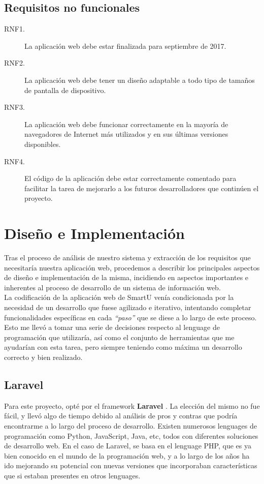 \subsection*{Requisitos no funcionales}
\begin{description}
    \item[RNF1.] La aplicación web debe estar finalizada para septiembre de 2017.
    \item[RNF2.] La aplicación web debe tener un diseño adaptable a todo tipo de tamaños de pantalla de dispositivo.
    \item[RNF3.] La aplicación web debe funcionar correctamente en la mayoría de navegadores de Internet más utilizados y en sus últimas versiones disponibles.
    \item[RNF4.] El código de la aplicación debe estar correctamente comentado para facilitar la tarea de mejorarlo a los futuros desarrolladores que continúen el proyecto.
\end{description}

\section{Diseño e Implementación}
Tras el proceso de análisis de nuestro sistema y extracción de los requisitos que necesitaría nuestra aplicación web, procedemos a describir los principales aspectos de diseño e implementación de la misma, incidiendo en aspectos importantes e inherentes al proceso de desarrollo de un sistema de información web.\\

La codificación de la aplicación web de SmartU venía condicionada por la necesidad de un desarrollo que fuese agilizado e iterativo, intentando completar funcionalidades específicas en cada \textit{``paso''} que se diese a lo largo de este proceso. Esto me llevó a tomar una serie de decisiones respecto al lenguage de programación que utilizaría, así como el conjunto de herramientas que me ayudarían con esta tarea, pero siempre teniendo como máxima un desarrollo correcto y bien realizado.

\subsection{Laravel}
Para este proyecto, opté por el framework \textbf{Laravel} \cite{laravel}. La elección del mismo no fue fácil, y llevó algo de tiempo debido al análisis de pros y contras que podría encontrarme a lo largo del proceso de desarrollo. Existen numerosos lenguages de programación como Python, JavaScript, Java, etc, todos con diferentes soluciones de desarrollo web. En el caso de Laravel, se basa en el lenguage PHP, que es ya bien conocido en el mundo de la programación web, y a lo largo de los años ha ido mejorando su potencial con nuevas versiones que incorporaban características que si estaban presentes en otros lenguages.\\

